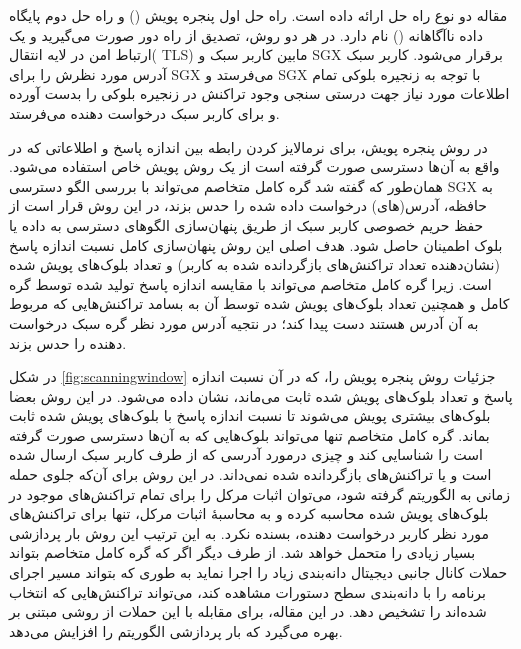 مقاله \cite{Matetic2019} دو نوع راه حل ارائه داده‌ است. راه حل اول پنجره پویش () و راه حل دوم پایگاه داده ناآگاهانه () نام دارد. در هر دو روش، تصدیق از راه دور صورت می‌گیرید و یک ارتباط امن در لایه انتقال(
TLS)
مابین کاربر سبک و SGX برقرار می‌شود. کاربر سبک آدرس مورد نظرش را برای SGX می‌فرستد و SGX با توجه به زنجیره بلوکی تمام اطلاعات مورد نیاز جهت درستی سنجی وجود تراکنش در زنجیره بلوکی را بدست آورده و برای کاربر سبک درخواست دهنده می‌فرستد. 

در روش پنجره پویش، برای نرمالایز کردن رابطه بین اندازه پاسخ‌ و اطلاعاتی که در واقع به آن‌ها دسترسی صورت گرفته است از یک روش پویش خاص استفاده می‌شود. همان‌طور که گفته شد گره کامل متخاصم می‌تواند با بررسی الگو دسترسی SGX به حافظه، آدرس(های) درخواست داده شده را حدس بزند، در این روش قرار است از حفظ حریم خصوصی کاربر سبک از طریق پنهان‌سازی الگو‌های دسترسی به داده‌ یا بلوک اطمینان حاصل شود. هدف اصلی این روش پنهان‌سازی کامل نسبت اندازه پاسخ (نشان‌دهنده تعداد تراکنش‌های بازگردانده شده به کاربر) و تعداد بلوک‌های پویش شده است. زیرا گره کامل متخاصم می‌تواند با مقایسه اندازه پاسخ تولید شده توسط گره کامل و همچنین تعداد بلوک‌های پویش شده توسط آن به بسامد تراکنش‌هایی که مربوط به آن آدرس هستند دست پیدا کند؛ در نتجیه آدرس مورد نظر گره سبک درخواست دهنده را حدس بزند.

در شکل \ref{fig:scanningwindow} جزئیات روش پنجره پویش را، که در آن نسبت اندازه پاسخ و تعداد بلوک‌های پویش شده ثابت می‌ماند، نشان داده می‌شود. در این روش بعضا بلوک‌های بیشتری پویش می‌شوند تا نسبت اندازه پاسخ با بلوک‌های پویش شده ثابت بماند. گره کامل متخاصم تنها می‌تواند بلوک‌هایی که به آن‌ها دسترسی صورت گرفته است را شناسایی کند و چیزی درمورد آدرسی که از طرف کاربر سبک ارسال شده است و یا تراکنش‌های بازگردانده شده نمی‌داند. در این روش برای آن‌که جلوی  حمله زمانی به الگوریتم گرفته شود، می‌توان اثبات مرکل را برای تمام تراکنش‌های موجود در بلوک‌های پویش شده محاسبه کرده و به محاسبهٔ اثبات مرکل، تنها برای تراکنش‌های مورد نظر کاربر درخواست دهنده، بسنده نکرد. به این ترتیب این روش بار پردازشی بسیار زیادی را متحمل خواهد شد. از طرف دیگر اگر که گره کامل متخاصم بتواند حملات کانال جانبی دیجیتال دانه‌بندی زیاد را اجرا نماید به طوری که بتواند مسیر اجرای برنامه را با دانه‌بندی سطح دستورات مشاهده کند، می‌تواند تراکنش‌هایی که انتخاب شده‌اند را تشخیص دهد. در این مقاله، برای مقابله با این حملات از روشی مبتنی بر \cite{Rane2015} بهره می‌گیرد که بار پردازشی الگوریتم را افزایش می‌دهد.


